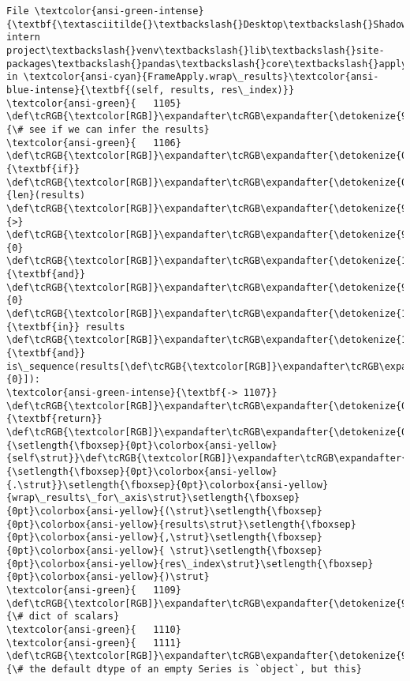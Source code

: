 \documentclass[11pt]{article}
\begin{document}
\begin{Verbatim}[commandchars=\\\{\}, frame=single, framerule=2mm, rulecolor=\color{outerrorbackground}]
File \textcolor{ansi-green-intense}{\textbf{\textasciitilde{}\textbackslash{}Desktop\textbackslash{}Shadowfox intern project\textbackslash{}venv\textbackslash{}lib\textbackslash{}site-packages\textbackslash{}pandas\textbackslash{}core\textbackslash{}apply.py:1107}}, in \textcolor{ansi-cyan}{FrameApply.wrap\_results}\textcolor{ansi-blue-intense}{\textbf{(self, results, res\_index)}}
\textcolor{ansi-green}{   1105} \def\tcRGB{\textcolor[RGB]}\expandafter\tcRGB\expandafter{\detokenize{95,135,135}}{\# see if we can infer the results}
\textcolor{ansi-green}{   1106} \def\tcRGB{\textcolor[RGB]}\expandafter\tcRGB\expandafter{\detokenize{0,135,0}}{\textbf{if}} \def\tcRGB{\textcolor[RGB]}\expandafter\tcRGB\expandafter{\detokenize{0,135,0}}{len}(results) \def\tcRGB{\textcolor[RGB]}\expandafter\tcRGB\expandafter{\detokenize{98,98,98}}{>} \def\tcRGB{\textcolor[RGB]}\expandafter\tcRGB\expandafter{\detokenize{98,98,98}}{0} \def\tcRGB{\textcolor[RGB]}\expandafter\tcRGB\expandafter{\detokenize{175,0,255}}{\textbf{and}} \def\tcRGB{\textcolor[RGB]}\expandafter\tcRGB\expandafter{\detokenize{98,98,98}}{0} \def\tcRGB{\textcolor[RGB]}\expandafter\tcRGB\expandafter{\detokenize{175,0,255}}{\textbf{in}} results \def\tcRGB{\textcolor[RGB]}\expandafter\tcRGB\expandafter{\detokenize{175,0,255}}{\textbf{and}} is\_sequence(results[\def\tcRGB{\textcolor[RGB]}\expandafter\tcRGB\expandafter{\detokenize{98,98,98}}{0}]):
\textcolor{ansi-green-intense}{\textbf{-> 1107}}     \def\tcRGB{\textcolor[RGB]}\expandafter\tcRGB\expandafter{\detokenize{0,135,0}}{\textbf{return}} \def\tcRGB{\textcolor[RGB]}\expandafter\tcRGB\expandafter{\detokenize{0,135,0}}{\setlength{\fboxsep}{0pt}\colorbox{ansi-yellow}{self\strut}}\def\tcRGB{\textcolor[RGB]}\expandafter\tcRGB\expandafter{\detokenize{98,98,98}}{\setlength{\fboxsep}{0pt}\colorbox{ansi-yellow}{.\strut}}\setlength{\fboxsep}{0pt}\colorbox{ansi-yellow}{wrap\_results\_for\_axis\strut}\setlength{\fboxsep}{0pt}\colorbox{ansi-yellow}{(\strut}\setlength{\fboxsep}{0pt}\colorbox{ansi-yellow}{results\strut}\setlength{\fboxsep}{0pt}\colorbox{ansi-yellow}{,\strut}\setlength{\fboxsep}{0pt}\colorbox{ansi-yellow}{ \strut}\setlength{\fboxsep}{0pt}\colorbox{ansi-yellow}{res\_index\strut}\setlength{\fboxsep}{0pt}\colorbox{ansi-yellow}{)\strut}
\textcolor{ansi-green}{   1109} \def\tcRGB{\textcolor[RGB]}\expandafter\tcRGB\expandafter{\detokenize{95,135,135}}{\# dict of scalars}
\textcolor{ansi-green}{   1110} 
\textcolor{ansi-green}{   1111} \def\tcRGB{\textcolor[RGB]}\expandafter\tcRGB\expandafter{\detokenize{95,135,135}}{\# the default dtype of an empty Series is `object`, but this}

\end{Verbatim}
\end{document}
